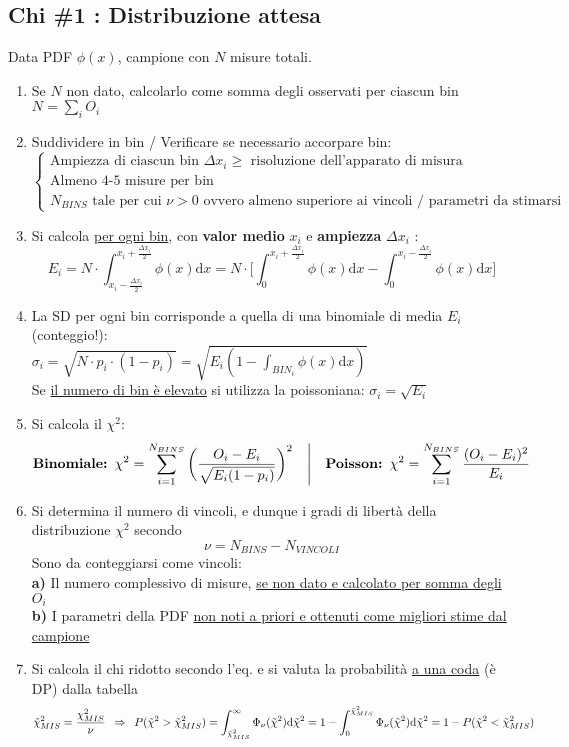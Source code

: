 \documentclass[11pt]{article}
\begin{document}
\subsection{Chi \#1 : Distribuzione attesa}
Data PDF $\phi(x)$, campione con $N$ misure totali.
\begin{enumerate}
\item Se $N$ non dato, calcolarlo come somma degli osservati per ciascun bin $N = \sum_i O_i$
\item Suddividere in bin / Verificare se necessario accorpare bin:
\[\begin{cases}
    \textrm{Ampiezza di ciascun bin $\Delta x_i \geq$ risoluzione dell'apparato di misura}\\
    \textrm{Almeno 4-5 misure per bin}\\
    \textrm{$N_{BINS}$ tale per cui $\nu > 0$ ovvero almeno superiore ai vincoli / parametri da stimarsi}
\end{cases}\]
\item Si calcola \underline{per ogni bin}, con \textbf{valor medio} $x_i$ e \textbf{ampiezza} $\Delta x_i$ :
\[E_i = N \cdot \int_{x_i - \frac{\Delta x_i}{2}}^{x_i + \frac{\Delta x_i}{2}} \phi(x) \textrm{d}x = N \cdot \Bigg[ \int_0^{x_i + \frac{\Delta x_i}{2}} \phi(x) \textrm{d}x - \int_0^{x_i - \frac{\Delta x_i}{2}} \phi(x) \textrm{d}x \Bigg]\]
\item La SD per ogni bin corrisponde a quella di una binomiale di media $E_i$ (conteggio!):
\\$\sigma_i = \sqrt{N \cdot p_i \cdot (1 - p_i)} = \sqrt{E_i (1 - \int_{BIN_i} \phi(x) \textrm{d}x)}$
\\Se \underline{il numero di bin è elevato} si utilizza la poissoniana: $\sigma_i = \sqrt{E_i}$
\item Si calcola il $\chi^2$:
\[\textrm{\textbf{Binomiale: }} \chi^2 = \sum \limits_{i = 1}^{N_{BINS}} \bigg(\frac{O_i - E_i}{\sqrt{E_i (1 - p_i)}}\bigg)^2 \quad \Bigg| \quad \textrm{\textbf{Poisson: }} \chi^2 = \sum \limits_{i = 1}^{N_{BINS}} \frac{(O_i - E_i)^2}{E_i}\]
\item Si determina il numero di vincoli, e dunque i gradi di libertà della distribuzione $\chi^2$ secondo 
\[\boxed{\nu = N_{BINS} - N_{VINCOLI}}\]
Sono da conteggiarsi come vincoli: 
\\\textbf{a)} Il numero complessivo di misure, \underline{se non dato e calcolato per somma degli $O_i$}
\\\textbf{b)} I parametri della PDF \underline{non noti a priori e ottenuti come migliori stime dal campione}

 \item Si calcola il chi ridotto secondo l'eq. e si valuta la probabilità \underline{a una coda} (è DP) dalla tabella
 \[\Tilde{\chi}^2_{MIS} = \frac{\chi^2_{MIS}}{\nu} \enspace \Rightarrow \enspace P(\Tilde{\chi}^2 > \Tilde{\chi}^2_{MIS}) = \int_{\Tilde{\chi}^2_{MIS}}^\infty \Phi_\nu (\Tilde{\chi}^2) \textrm{d}\Tilde{\chi}^2 = 1 - \int^{\Tilde{\chi}^2_{MIS}}_0 \Phi_\nu (\Tilde{\chi}^2) \textrm{d}\Tilde{\chi}^2 = 1 - P(\Tilde{\chi}^2 < \Tilde{\chi}^2_{MIS})\]
\end{enumerate}
\end{document}
